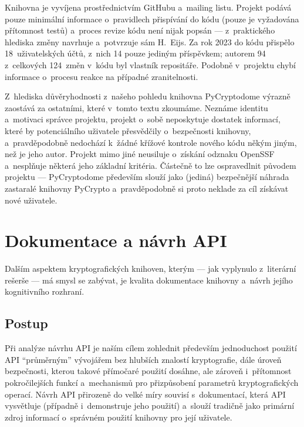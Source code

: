 Knihovna je vyvíjena prostřednictvím GitHubu a~mailing listu. Projekt podává pouze minimální informace o~pravidlech přispívání do kódu (pouze je vyžadována přítomnost testů) a~proces revize kódu není nijak popsán --- z~praktického hlediska změny navrhuje a~potvrzuje sám H.~Eijs. Za rok 2023 do kódu přispělo 18~uživatelských účtů, z~nich 14 pouze jediným příspěvkem; autorem 94 z~celkových 124~změn v~kódu byl vlastník repositáře. Podobně v~projektu chybí informace o~procesu reakce na případné zranitelnosti.

Z~hlediska důvěryhodnosti z~našeho pohledu knihovna PyCryptodome výrazně zaostává za ostatními, které v~tomto textu zkoumáme. Neznáme identitu a~motivaci správce projektu, projekt o~sobě neposkytuje dostatek informací, které by potenciálního uživatele přesvědčily o~bezpečnosti knihovny, a~pravděpodobně nedochází k~žádné křížové kontrole nového kódu někým jiným, než je jeho autor. Projekt mimo jiné neusiluje o~získání odznaku OpenSSF a~nesplňuje některá jeho základní kritéria. Částečně to lze ospravedlnit původem projektu --- PyCryptodome především slouží jako (jediná) bezpečnější náhrada zastaralé knihovny PyCrypto a~pravděpodobně si proto neklade za cíl získávat nové uživatele.

\section{Dokumentace a návrh API} \label{analyza-dok-a-navrh}

Dalším aspektem kryptografických knihoven, kterým --- jak vyplynulo z~literární rešerše --- má smysl se zabývat, je kvalita dokumentace knihovny a~návrh jejího kognitivního rozhraní.

\subsection{Postup} \label{analyza-beznepouziti}

Při analýze návrhu API je naším cílem zohlednit především jednoduchost použití API ``prů\-měr\-ným'' vývojářem bez hlubších znalostí kryptografie, dále úroveň bezpečnosti, kterou takové přímočaré použití dosáhne, ale zároveň i~přítomnost pokročilejších funkcí a~mechanismů pro přizpůsobení parametrů kryptografických operací. Návrh API přirozeně do velké míry souvisí s~dokumentací, která API vysvětluje (případně i~demonstruje jeho použití) a~slouží tradičně jako primární zdroj informací o~správném použití knihovny pro její uživatele.

